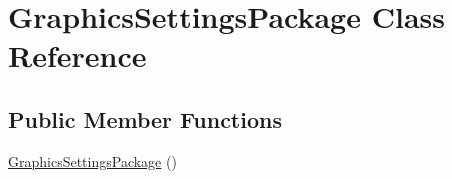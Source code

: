 \hypertarget{class_graphics_settings_package}{}\section{Graphics\+Settings\+Package Class Reference}
\label{class_graphics_settings_package}
\subsection*{Public Member Functions}
\begin{DoxyCompactItemize}
\item 
\hyperlink{class_graphics_settings_package_a52641ab244a183d2c77519b21bf33f26}{Graphics\+Settings\+Package} ()\hypertarget{class_graphics_settings_package_a52641ab244a183d2c77519b21bf33f26}{}\label{class_graphics_settings_package_a52641ab244a183d2c77519b21bf33f26}


\end{DoxyCompactItemize}
